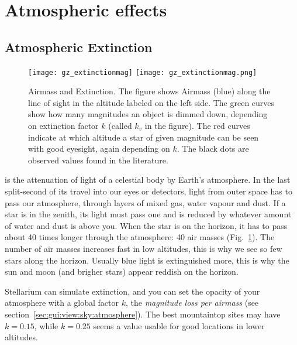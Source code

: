 \section{Atmospheric effects}
\label{sec:phenomena:Atmosphere}

\subsection{Atmospheric Extinction}
\label{sec:phenomena:Extinction}

\begin{figure}[tb]
\centering
\ifpdf
\texttt{[image: gz\_extinctionmag]}
\else
\texttt{[image: gz\_extinctionmag.png]}
\fi
\caption{Airmass and Extinction.  The figure shows Airmass (blue)
  along the line of sight in the altitude labeled on the left side.
  The green curves show how many magnitudes an object is dimmed down,
  depending on extinction factor $k$ (called $k_v$ in the figure). The
  red curves indicate at which altitude a star of given magnitude can
  be seen with good eyesight, again depending on $k$. The black dots
  are observed values found in the literature.}
\label{fig:Extinction}
\end{figure}

 is the attenuation of light of a
celestial body by Earth's atmosphere. In the last split-second of its
travel into our eyes or detectors, light from outer space has to pass
our atmosphere, through layers of mixed gas, water vapour and dust. If
a star is in the zenith, its light must pass one 
and is reduced by whatever amount of water and dust is above you. When
the star is on the horizon, it has to pass about 40 times longer
through the atmosphere: 40 air masses (Fig.~\ref{fig:Extinction}). The
number of air masses increases fast in low altitudes, this is why we
see so few stars along the horizon. Usually blue light is extinguished
more, this is why the sun and moon (and brigher stars) appear reddish
on the horizon.

Stellarium can simulate extinction, and you can set the opacity of
your atmosphere with a global factor $k$, the \emph{magnitude loss per
  airmass} (see section~\ref{sec:gui:view:sky:atmosphere}). The best
mountaintop sites may have $k=0.15$, while $k=0.25$ seems a value
usable for good locations in lower altitudes.

